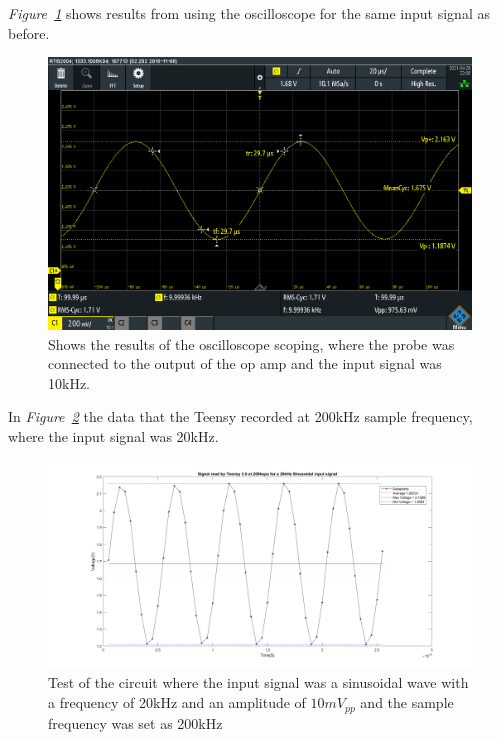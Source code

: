\textit{Figure~\ref{fig:Oscillo10k100k}} shows results from using the oscilloscope for the same input signal as before.

\begin{figure}[h]
    \centering
    \includegraphics[width=1.0\textwidth]{graphics/10k10mvPP100ksamp.PNG}
    \caption{Shows the results of the oscilloscope scoping, where the probe was connected to the output of the op amp and the input signal was 10kHz.}
    \label{fig:Oscillo10k100k}
\end{figure}

In \textit{Figure~\ref{fig:Teensy20k200k}} the data that the Teensy recorded at 200kHz sample frequency, where the input signal was 20kHz.

\begin{figure}[h]
    \centering
    \includegraphics[width=1.0\textwidth]{graphics/20kin_200ksampl.png}
    \caption{Test of the circuit where the input signal was a sinusoidal wave with a frequency of 20kHz and an amplitude of $10mV_{pp}$ and the sample frequency was set as 200kHz}
    \label{fig:Teensy20k200k}
\end{figure}


